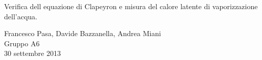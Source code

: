 \begin{center}

	\vspace{0.5cm}
     	{\huge Verifica dell equazione di Clapeyron e misura del calore latente di vaporizzazione dell'acqua.}
	\vspace{0.5cm}

      	{\large Francesco Pasa, Davide Bazzanella, Andrea Miani} \\
		{\large Gruppo A6} \\
	
	\vspace{0.2cm}
      	{\large 30 settembre 2013}
    
    \vspace{0.7cm}

\end{center}
